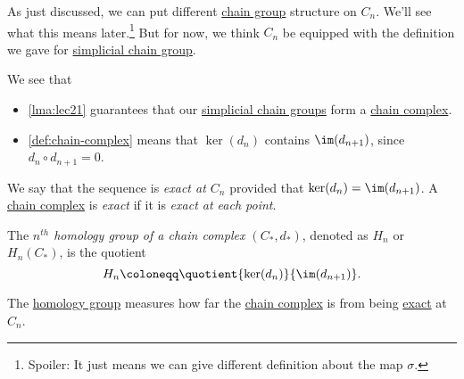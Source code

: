 \begin{note}
	As just discussed, we can put different \hyperref[def:chain-group]{chain group} structure on \(C_{n} \). We'll see what this means
	later.\footnote{Spoiler: It just means we can give different definition about the map \(\sigma\).}
	But for now, we think \(C_{n} \) be equipped with the definition we gave for \hyperref[def:simplicial-chain-group]{simplicial chain group}.
\end{note}

\begin{remark}
	We see that
	\begin{itemize}
		\item \autoref{lma:lec21} guarantees that our \hyperref[def:simplicial-chain-group]{simplicial chain groups} form a \hyperref[def:chain-complex]{chain complex}.
		\item \autoref{def:chain-complex} means that \(\ker (d_{n} ) \) contains \(\im  (d_{n+1})\), since \(d_{n} \circ d_{n+1} = 0\).
	\end{itemize}
\end{remark}

\begin{definition}[Exact]\label{def:exact}
	We say that the sequence is \emph{exact at \(C_{n} \)} provided that \(\ker (d_{n}) = \im (d_{n+1})\). A \hyperref[def:chain-complex]{chain complex} is \emph{exact}
	if it is \emph{exact at each point}.
\end{definition}

\begin{definition}\label{def:homology-group}
	The \emph{\(n^{th} \) homology group of a chain complex \((C_\ast, d_\ast)\)}, denoted as \(H_{n} \) or \(H_{n} (C_\ast)\), is the quotient
	\[
		H_{n} \coloneqq \quotient{\ker  (d_{n} )}{\im  (d_{n+1})}.
	\]
\end{definition}
\begin{remark}
	The \hyperref[def:homology-group]{homology group} measures how far the \hyperref[def:chain-complex]{chain complex} is from being \hyperref[def:exact]{exact} at \(C_{n} \).
\end{remark}

